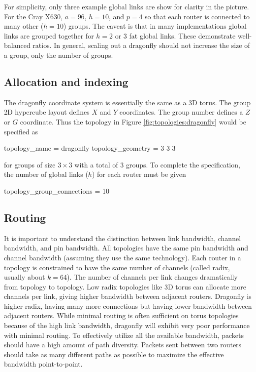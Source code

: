 For simplicity, only three example global links are show for clarity in the picture.
For the Cray X630, $a = 96$, $h=10$, and $p=4$ so that each router is connected to many other ($h=10$) groups.
The caveat is that in many implementations global links are grouped together for $h=2$ or $3$ fat global links.
These demonstrate well-balanced ratios.
In general, scaling out a dragonfly should not increase the size of a group, only the number of groups.

\subsection{Allocation and indexing}
The dragonfly coordinate system is essentially the same as a 3D torus.  
The group 2D hypercube layout defines $X$ and $Y$ coordinates.
The group number defines a $Z$ or $G$ coordinate.
Thus the topology in Figure \ref{fig:topologies:dragonfly} would be specified as

\begin{ViFile}
topology_name = dragonfly
topology_geometry = 3 3 3
\end{ViFile}
for groups of size $3 \times 3$ with a total of 3 groups.
To complete the specification, the number of global links ($h$) for each router must be given
\begin{ViFile}
topology_group_connections = 10
\end{ViFile}

\subsection{Routing}
It is important to understand the distinction between link bandwidth, channel bandwidth, and pin bandwidth.
All topologies have the same pin bandwidth and channel bandwidth (assuming they use the same technology).
Each router in a topology is constrained to have the same number of channels (called radix, usually about $k=64$).
The number of channels per link changes dramatically from topology to topology.
Low radix topologies like 3D torus can allocate more channels per link, 
giving higher bandwidth between adjacent routers.
Dragonfly is higher radix, having many more connections but having lower bandwidth between adjacent routers.
While minimal routing is often sufficient on torus topologies because of the high link bandwidth,
dragonfly will exhibit very poor performance with minimal routing.
To effectively utilize all the available bandwidth, packets should have a high amount of path diversity.
Packets sent between two routers should take as many different paths as possible to maximize the effective bandwidth point-to-point.

